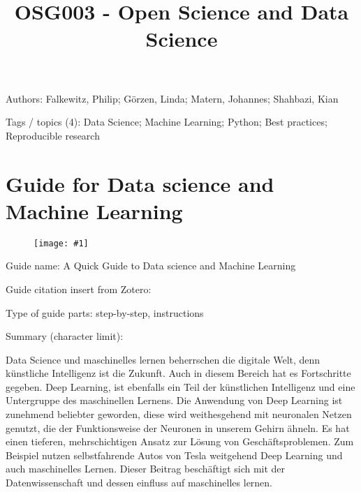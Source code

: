 \documentclass{article}
\newlength{\imgwidth}
\newcommand\scaledgraphics[2]{%
                
\settowidth{\imgwidth}{\texttt{[image: \#1]}}%
                
\setlength{\imgwidth}{\minof{\imgwidth}{#2\textwidth}}%
                
\texttt{[image: \#1]}%
                
}
\begin{document}
\title{OSG003 - Open Science and Data Science}

\maketitle


Authors: Falkewitz, Philip;  Görzen, Linda; Matern, Johannes;  Shahbazi, Kian 


Tags / topics (4): Data Science; Machine Learning; Python; Best practices; Reproducible research





\section{Guide for Data science and Machine Learning}\label{H2305886}






\begin{center}
\begin{figure}
\scaledgraphics{a6637b1c-427c-4ae5-a756-e31455d2fc96.png}{0.5}
\label{F25480991}
\end{figure}


\end{center}


 


Guide name: A Quick Guide to Data science and Machine Learning


Guide citation insert from Zotero: \autocite{qureshi_quick_2020}





Type of guide parts: step-by-step, instructions


Summary (character limit): 


Data Science und maschinelles lernen beherrschen die digitale Welt, denn künstliche Intelligenz ist die Zukunft. Auch in diesem Bereich hat es Fortschritte gegeben. Deep Learning, ist ebenfalls ein Teil der künstlichen Intelligenz und eine Untergruppe des maschinellen Lernens. Die Anwendung von Deep Learning ist zunehmend beliebter geworden, diese wird weithesgehend mit neuronalen Netzen genutzt, die der Funktionsweise der Neuronen in unserem Gehirn ähneln. Es hat einen tieferen, mehrschichtigen Ansatz zur Lösung von Geschäftsproblemen. Zum Beispiel nutzen selbstfahrende Autos von Tesla weitgehend Deep Learning und auch maschinelles Lernen. Dieser Beitrag beschäftigt sich mit der Datenwissenschaft und dessen einfluss auf maschinelles lernen.
\end{document}
